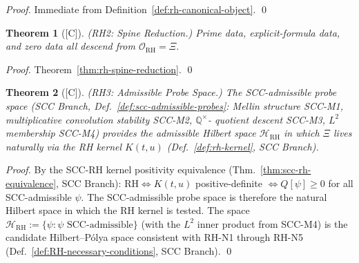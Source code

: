 \documentclass[12pt,oneside]{amsbook}
\theoremstyle{plain}
\newtheorem{theorem}{Theorem}[section]
\theoremstyle{definition}
\theoremstyle{remark}
\newcommand{\status}[1]{\textup{[#1]}}
\begin{document}
\begin{proof}
Immediate from Definition~\ref{def:rh-canonical-object}. \qed
\end{proof}

\begin{theorem}[\status{C}]\label{thm:RH2}
\textup{(RH2: Spine Reduction.)}
Prime data, explicit-formula data, and zero data all descend from
$\mathcal{O}_{\mathrm{RH}} = \Xi$.
\end{theorem}

\begin{proof}
Theorem~\ref{thm:rh-spine-reduction}. \qed
\end{proof}

\begin{theorem}[\status{C}]\label{thm:RH3}
\textup{(RH3: Admissible Probe Space.)}
The SCC-admissible probe space (SCC Branch,
Def.~\ref{def:scc-admissible-probes}: Mellin structure SCC-M1,
multiplicative convolution stability SCC-M2, $\mathbb{Q}^\times$-
quotient descent SCC-M3, $L^2$ membership SCC-M4) provides the
admissible Hilbert space $\mathcal{H}_{\mathrm{RH}}$ in which $\Xi$
lives naturally via the RH kernel $K(t,u)$
(Def.~\ref{def:rh-kernel}, SCC Branch).
\end{theorem}

\begin{proof}
By the SCC-RH kernel positivity equivalence
(Thm.~\ref{thm:scc-rh-equivalence}, SCC Branch):
$\mathrm{RH} \Leftrightarrow K(t,u)$ positive-definite
$\Leftrightarrow Q[\psi] \geq 0$ for all SCC-admissible $\psi$.
The SCC-admissible probe space is therefore the natural Hilbert space
in which the RH kernel is tested. The space $\mathcal{H}_{\mathrm{RH}}
:= \{\psi : \psi \text{ SCC-admissible}\}$ (with the $L^2$ inner
product from SCC-M4) is the candidate Hilbert--P\'olya space
consistent with RH-N1 through RH-N5 (Def.~\ref{def:RH-necessary-conditions},
SCC Branch). \qed
\end{proof}
\end{document}
